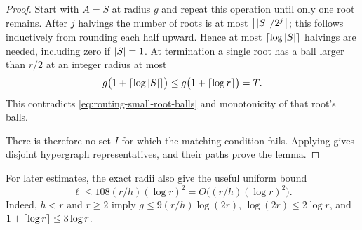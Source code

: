 \begin{proof}
Start with $A=S$ at radius $g$ and repeat this operation until only one
root remains.  After $j$ halvings the number of roots is at most
$\left\lceil\left|S\right|/2^j\right\rceil$; this follows inductively from rounding each half
upward.  Hence at most $\left\lceil\log\left|S\right|\right\rceil$ halvings are needed,
including zero if $\left|S\right|=1$.  At termination a single root has a ball
larger than $r/2$ at an integer radius at most
\[
  g\bigl(1+\left\lceil\log\left|S\right|\right\rceil\bigr)
  \le g\bigl(1+\left\lceil\log r\right\rceil\bigr)=T.
\]
This contradicts \eqref{eq:routing-small-root-balls} and monotonicity of
that root's balls.

There is therefore no set $I$ for which the matching condition fails.
Applying  gives disjoint hypergraph
representatives, and their paths prove the lemma.
\end{proof}

For later estimates, the exact radii also give the useful uniform bound
\begin{equation}\label{eq:routing-length-bound}
  \ell\le 108(r/h)(\log r)^2
  =O\bigl((r/h)(\log r)^2\bigr).
\end{equation}
Indeed, $h<r$ and $r\ge 2$ imply
$g\le 9(r/h)\log(2r)$,
$\log(2r)\le 2\log r$, and
$1+\left\lceil\log r\right\rceil\le 3\log r$.
